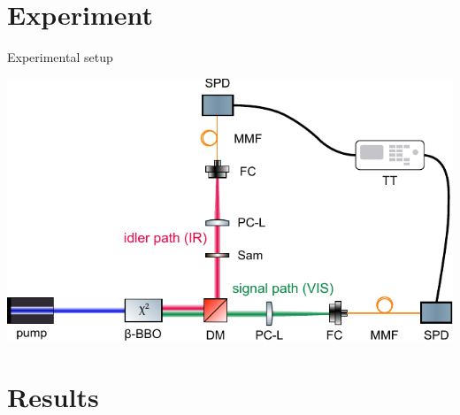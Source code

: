 \documentclass[10pt,aspectratio=43]{beamer}
\begin{document}
	
	\section{Experiment}
	\begin{frame}{Experimental setup}
			\begin{center}
				\includegraphics[width=.7\textwidth]{Images/DupishSetup.pdf}
			\end{center}
			
	\end{frame}
	\section{Results}
	
\end{document}
